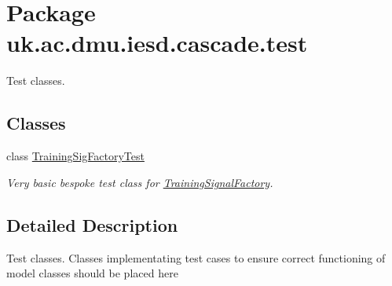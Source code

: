 \hypertarget{namespaceuk_1_1ac_1_1dmu_1_1iesd_1_1cascade_1_1test}{\section{Package uk.\-ac.\-dmu.\-iesd.\-cascade.\-test}
\label{namespaceuk_1_1ac_1_1dmu_1_1iesd_1_1cascade_1_1test}
}


Test classes.  


\subsection*{Classes}
\begin{DoxyCompactItemize}
\item 
class \hyperlink{classuk_1_1ac_1_1dmu_1_1iesd_1_1cascade_1_1test_1_1_training_sig_factory_test}{Training\-Sig\-Factory\-Test}
\begin{DoxyCompactList}\small\item\em Very basic bespoke test class for \hyperlink{classuk_1_1ac_1_1dmu_1_1iesd_1_1cascade_1_1util_1_1profilegenerators_1_1_training_signal_factory}{Training\-Signal\-Factory}. \end{DoxyCompactList}\end{DoxyCompactItemize}


\subsection{Detailed Description}
Test classes. Classes implementating test cases to ensure correct functioning of model classes should be placed here 